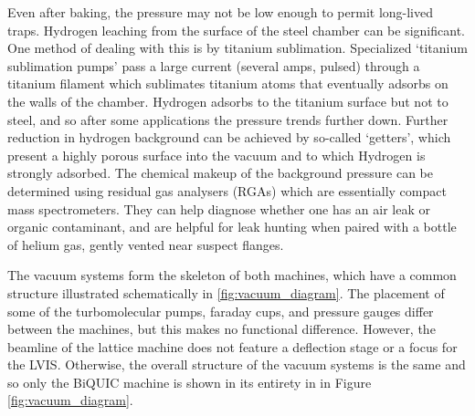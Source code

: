 	Even after baking, the pressure may not be low enough to permit long-lived traps.
	Hydrogen leaching from the surface of the steel chamber can be significant.
	One method of dealing with this is by titanium sublimation.
	Specialized `titanium sublimation pumps' pass a large current (several amps, pulsed) through a titanium filament which sublimates titanium atoms that eventually adsorbs on the walls of the chamber.
	Hydrogen adsorbs to the titanium surface but not to steel, and so after some applications the pressure trends further down.
	Further reduction in hydrogen background can be achieved by so-called `getters', which present a highly porous surface into the vacuum and to which Hydrogen is strongly adsorbed.
	The chemical makeup of the background pressure can be determined using residual gas analysers (RGAs) which are essentially compact mass spectrometers.
	They can help diagnose whether one has an air leak or organic contaminant, and are helpful for leak hunting when paired with a bottle of helium gas, gently vented near suspect flanges.

	The vacuum systems form the skeleton of both machines, which have a common structure illustrated schematically in \ref{fig:vacuum_diagram}.
	The placement of some of the turbomolecular pumps, faraday cups, and pressure gauges differ between the machines, but this makes no functional difference.
	However, the beamline of the lattice machine does not feature a deflection stage or a focus for the LVIS.
	Otherwise, the overall structure of the vacuum systems is the same and so only the BiQUIC machine is shown in its entirety in in Figure \ref{fig:vacuum_diagram}.

